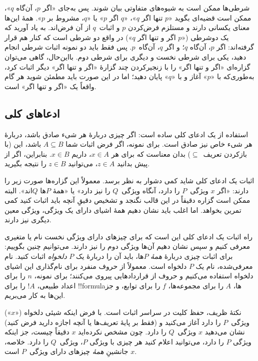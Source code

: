 \documentclass[../../../include/open-logic-section]{subfiles}
\begin{document}
شرطی‌ها ممکن است به شیوه‌های متفاوتی بیان شوند. پس به‌جای «اگر
$p$، آن‌گاه $q$»، ممکن است قضیه‌ای بگوید «$p$ تنها اگر $q$»،
«$q$ اگر $p$» یا «$q$، مشروط بر $p$». همهٔ این‌ها معنای یکسانی
دارند و مستلزم فرض‌کردن $p$ و اثبات~$q$ از آن فرض‌اند. به یاد آورید
که یک دوشرطی («$p$ اگر و تنها اگر $q$») در واقع دو شرطی است که کنار
هم قرار گرفته‌اند: اگر $p$، آن‌گاه $q$؛ و اگر $q$، آن‌گاه~$p$.
پس فقط باید دو نمونه اثبات شرطی انجام دهید، یکی برای شرطی نخست و
دیگری برای شرطی دوم. بااین‌حال، گاهی می‌توان گزاره‌ای «اگر و تنها
اگر» را با زنجیرکردن چند گزارهٔ «اگر و تنها اگر» دیگر اثبات کرد،
به‌طوری‌که با «$p$» آغاز و با «$q$» پایان دهید؛ اما در این صورت
باید مطمئن شوید هر گام واقعاً یک «اگر و تنها اگر» است.

\subsection{ادعاهای کلی}

استفاده از یک ادعای کلی ساده است: اگر چیزی دربارهٔ هر شیء صادق باشد،
دربارهٔ هر شیء خاص نیز صادق است. برای نمونه، اگر فرض اثبات شما
$A \subseteq B$ باشد، این (با بازکردن تعریف~$\subseteq$) بدان معناست
که برای هر $x \in A$، داریم $x \in B$. بنابراین، اگر از پیش بدانید
$z \in A$، می‌توانید $z \in B$ را نتیجه بگیرید.

اثبات یک ادعای کلی شاید کمی دشوار به نظر برسد. معمولاً این گزاره‌ها
صورت زیر را دارند: «اگر $x$ ویژگی~$P$ را دارد، آنگاه ویژگی~$Q$ را
نیز دارد» یا «همهٔ $P$ها $Q$اند». البته ممکن است گزاره دقیقاً در
این قالب نگنجد و تشخیص دقیقِ آنچه باید اثبات کنید کمی تمرین بخواهد.
اما اغلب باید نشان دهیم همهٔ اشیای دارای یک ویژگی، ویژگی معین دیگری
نیز دارند.

راه اثبات یک ادعای کلی این است که برای چیزهای دارای ویژگی نخست نام
یا متغیری معرفی کنیم و سپس نشان دهیم آن‌ها ویژگی دوم را نیز دارند.
می‌توانیم چنین بگوییم: برای اثبات چیزی دربارهٔ \emph{همهٔ} $P$ها،
باید آن را دربارهٔ یک $P$ \emph{دلخواه} اثبات کنید. نام معرفی‌شده،
نام یک $P$ دلخواه است. معمولاً از حروف منفرد برای نام‌گذاری این
اشیای دلخواه استفاده می‌کنیم و حروف از قراردادهایی پیروی می‌کنند؛
برای نمونه، $n$ را برای اعداد طبیعی، $!A$ را برای !!{formula}ها،
$A$ را برای مجموعه‌ها، $f$ را برای توابع، و جز این‌ها به کار
می‌بریم.

نکتهٔ ظریف، حفظ کلیت در سراسر اثبات است. با فرض اینکه شیئی دلخواه
(«$x$») ویژگی~$P$ را دارد آغاز می‌کنید و (فقط بر پایهٔ تعریف‌ها یا
آنچه اجازه دارید فرض کنید) نشان می‌دهید $x$ ویژگی~$Q$ را دارد. چون
مشخص نکرده‌اید $x$ دقیقاً چیست، جز اینکه ویژگی $P$ را دارد، می‌توانید
اعلام کنید هر چیزی با ویژگی $P$، ویژگی~$Q$ را دارد. خلاصه، $x$
جانشینِ \emph{همهٔ} چیزهای دارای ویژگی~$P$ است.
\end{document}
